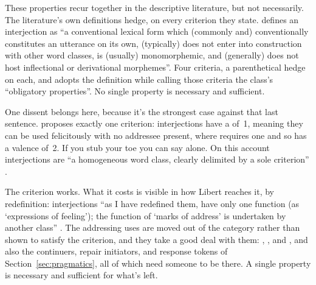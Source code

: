 \documentclass[12pt]{article}
\begin{document}
These properties recur together in the descriptive literature, but not
necessarily. The
literature's own definitions hedge, on every criterion they state.
\textcite[124]{wilkins1992} defines an interjection as
\enquote{a conventional lexical form which (commonly and) conventionally
constitutes an utterance on its own, (typically) does not enter into
construction with other word classes, is (usually) monomorphemic, and
(generally) does not host inflectional or derivational morphemes}. Four
criteria, a parenthetical hedge on each, and
\textcite[73]{gehweiler2008} adopts the definition while calling those
criteria the class's \enquote{obligatory properties}. No single property
is necessary and sufficient.

One dissent belongs here, because it's the strongest case against that last
sentence. \textcite[287, 292]{libert2012} proposes exactly one criterion:
interjections have a  of~1, meaning they can be
used felicitously with no addressee present, where  requires
one and so has a valence of~2. If you stub your toe you can say
 alone. On this account interjections are
\enquote{a homogeneous word class, clearly delimited by a sole criterion}
\citep[294]{libert2012}.

The criterion works. What it costs is visible in how Libert reaches it, by
redefinition: interjections \enquote{as I have redefined them, have
only one function (as `expressions of feeling'); the function of `marks of
address' is undertaken by another class} \citep[294]{libert2012}. The
addressing uses are moved out of the category rather than shown to satisfy
the criterion, and they take a good deal with them: ,
, and , and also the continuers, repair
initiators, and response tokens of Section~\ref{sec:pragmatics}, all of
which need someone to be there. A single property is necessary and
sufficient for what's left.
\end{document}
